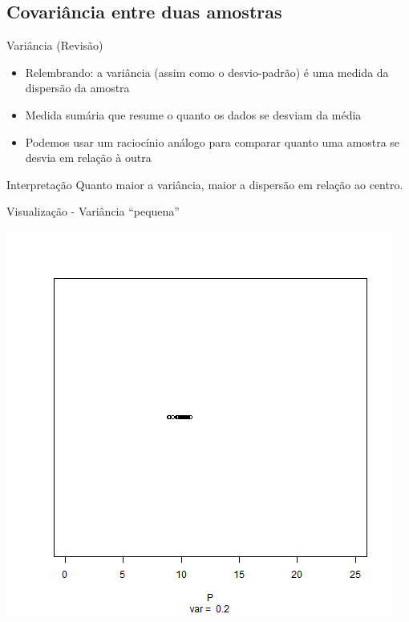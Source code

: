 \documentclass{beamer}
\begin{document}
\subsection[Covariância]{Covariância entre duas amostras}

\begin{frame}{Variância (Revisão)}
  \begin{itemize}
  \item Relembrando: a variância (assim como o desvio-padrão) é uma
    medida da dispersão da amostra
  \item Medida sumária que resume o quanto os dados se desviam da
    média
  \item Podemos usar um raciocínio análogo para comparar quanto uma
    amostra se desvia em relação à outra
  \end{itemize}
  \begin{block}{Interpretação}
    Quanto maior a variância, maior a dispersão em relação ao centro.
  \end{block}
\end{frame}

\begin{frame}{Visualização - Variância ``pequena''}
  \begin{center}
    \includegraphics[height=.8\textheight]{Cap17/dot-P}
  \end{center}
\end{frame}
\end{document}
